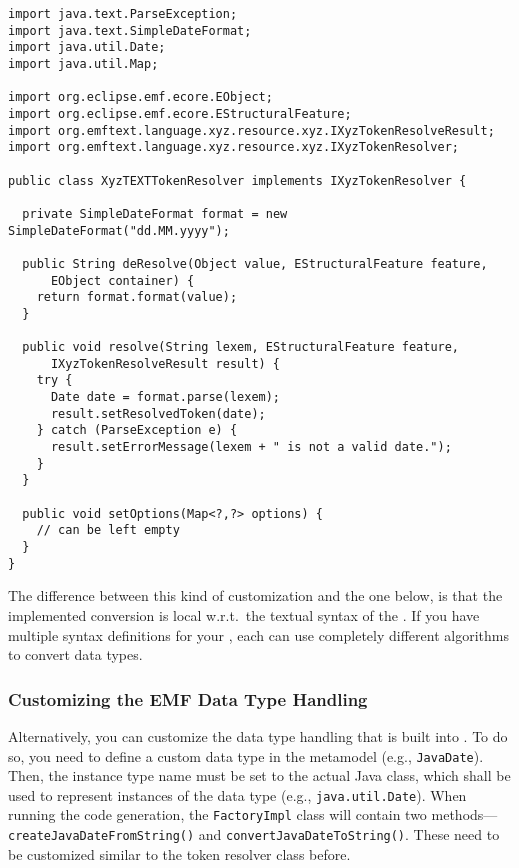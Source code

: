 \lstset{language=Java}
\begin{lstlisting}
import java.text.ParseException;
import java.text.SimpleDateFormat;
import java.util.Date;
import java.util.Map;

import org.eclipse.emf.ecore.EObject;
import org.eclipse.emf.ecore.EStructuralFeature;
import org.emftext.language.xyz.resource.xyz.IXyzTokenResolveResult;
import org.emftext.language.xyz.resource.xyz.IXyzTokenResolver;

public class XyzTEXTTokenResolver implements IXyzTokenResolver {
  
  private SimpleDateFormat format = new SimpleDateFormat("dd.MM.yyyy");
  
  public String deResolve(Object value, EStructuralFeature feature, 
      EObject container) {
    return format.format(value);
  }
  
  public void resolve(String lexem, EStructuralFeature feature, 
      IXyzTokenResolveResult result) {
    try {
      Date date = format.parse(lexem);
      result.setResolvedToken(date);
    } catch (ParseException e) {
      result.setErrorMessage(lexem + " is not a valid date.");
    }
  }
  
  public void setOptions(Map<?,?> options) {
    // can be left empty
  }
}
\end{lstlisting}

The difference between this kind of customization and the one below, is
that the implemented conversion is local w.r.t.~the textual syntax of the \DSL.
If you have multiple syntax definitions for your \DSL, each can use completely
different algorithms to convert data types.

\subsubsection{Customizing the EMF Data Type Handling}

Alternatively, you can customize the data type handling that is built into \EMF.
To do so, you need to define a custom data type in the metamodel (e.g.,
\texttt{JavaDate}). Then, the instance type name must be set to the actual Java
class, which shall be used to represent instances of the data type (e.g.,
\texttt{java.util.Date}). When running the \EMF code generation, the
\texttt{FactoryImpl} class will contain two
methods---\texttt{createJavaDateFromString()} and
\texttt{convertJavaDateToString()}. These need to be customized similar to the
token resolver class before.

